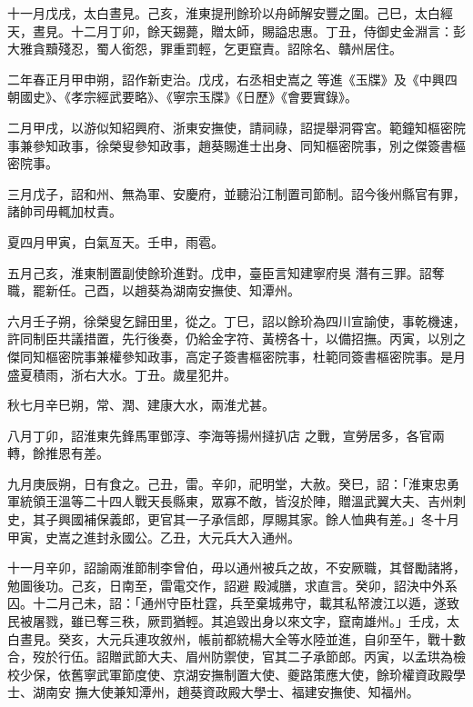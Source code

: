 \begin{pinyinscope}
 十一月戊戌，太白晝見。己亥，淮東提刑餘玠以舟師解安豐之圍。己巳，太白經天，晝見。十二月丁卯，餘天錫薨，贈太師，賜謚忠惠。丁丑，侍御史金淵言：彭大雅貪黷殘忍，蜀人銜怨，罪重罰輕，乞更竄責。詔除名、贛州居住。



 二年春正月甲申朔，詔作新吏治。戊戌，右丞相史嵩之
 等進《玉牒》及《中興四朝國史》、《孝宗經武要略》、《寧宗玉牒》《日歷》《會要實錄》。



 二月甲戌，以游似知紹興府、浙東安撫使，請祠祿，詔提舉洞霄宮。範鐘知樞密院事兼參知政事，徐榮叟參知政事，趙葵賜進士出身、同知樞密院事，別之傑簽書樞密院事。



 三月戊子，詔和州、無為軍、安慶府，並聽沿江制置司節制。詔今後州縣官有罪，諸帥司毋輒加杖責。



 夏四月甲寅，白氣亙天。壬申，雨雹。



 五月己亥，淮東制置副使餘玠進對。戊申，臺臣言知建寧府吳
 潛有三罪。詔奪職，罷新任。己酉，以趙葵為湖南安撫使、知潭州。



 六月壬子朔，徐榮叟乞歸田里，從之。丁巳，詔以餘玠為四川宣諭使，事乾機速，許同制臣共議措置，先行後奏，仍給金字符、黃榜各十，以備招撫。丙寅，以別之傑同知樞密院事兼權參知政事，高定子簽書樞密院事，杜範同簽書樞密院事。是月盛夏積雨，浙右大水。丁丑。歲星犯井。



 秋七月辛巳朔，常、潤、建康大水，兩淮尤甚。



 八月丁卯，詔淮東先鋒馬軍鄧淳、李海等揚州撻扒店
 之戰，宣勞居多，各官兩轉，餘推恩有差。



 九月庚辰朔，日有食之。己丑，雷。辛卯，祀明堂，大赦。癸巳，詔：「淮東忠勇軍統領王溫等二十四人戰天長縣東，眾寡不敵，皆沒於陣，贈溫武翼大夫、吉州刺史，其子興國補保義郎，更官其一子承信郎，厚賜其家。餘人恤典有差。」冬十月甲寅，史嵩之進封永國公。乙丑，大元兵大入通州。



 十一月辛卯，詔諭兩淮節制李曾伯，毋以通州被兵之故，不安厥職，其督勵諸將，勉圖後功。己亥，日南至，雷電交作，詔避
 殿減膳，求直言。癸卯，詔決中外系囚。十二月己未，詔：「通州守臣杜霆，兵至棄城弗守，載其私帑渡江以遁，遂致民被屠戮，雖已奪三秩，厥罰猶輕。其追毀出身以來文字，竄南雄州。」壬戌，太白晝見。癸亥，大元兵連攻敘州，帳前都統楊大全等水陸並進，自卯至午，戰十數合，歿於行伍。詔贈武節大夫、眉州防禦使，官其二子承節郎。丙寅，以孟珙為檢校少保，依舊寧武軍節度使、京湖安撫制置大使、夔路策應大使，餘玠權資政殿學士、湖南安
 撫大使兼知潭州，趙葵資政殿大學士、福建安撫使、知福州。




\end{pinyinscope}
